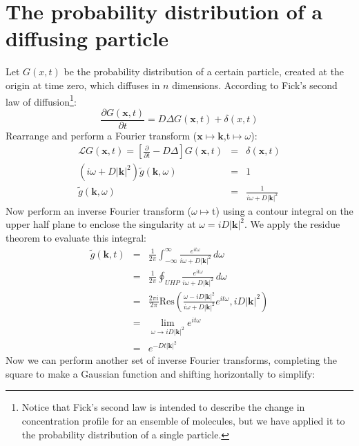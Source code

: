 \documentclass{article}
\begin{document}
\large

\section*{The probability distribution of a diffusing particle}
Let  $G(x,t)$ be the probability distribution of a certain particle, created at the origin at time zero, which diffuses in $n$ dimensions. According to Fick's second law of diffusion\footnote{Notice that Fick's second law is intended to describe the change in concentration profile for an ensemble of molecules, but we have applied it to the probability distribution of a single particle.}:
\[ \frac{\partial G(\mathbf{x},t)}{\partial t} = D \Delta G(\mathbf{x},t) + \delta(x,t) \]
Rearrange and perform a Fourier transform ($\mathbf{x} \mapsto \mathbf{k}$,t$\mapsto \omega$):
\begin{eqnarray}
\mathcal{L}G(\mathbf{x},t) = \left[ \frac{\partial}{\partial t} - D \Delta \right]G(\mathbf{x},t) & = & \delta(\mathbf{x},t) \nonumber \\
\left(i\omega + D|\mathbf{k}|^2 \right) \tilde{g}(\mathbf{k},\omega) & = & 1 \nonumber \\
\tilde{g}(\mathbf{k},\omega) & = & \frac{1}{i\omega + D|\mathbf{k}|^2} \nonumber
\end{eqnarray}
Now perform an inverse Fourier transform ($\omega \mapsto$t) using a contour integral on the upper half plane to enclose the singularity at $\omega=iD|\mathbf{k}|^2$. We apply the residue theorem to evaluate this integral:
\begin{eqnarray}
\tilde{g}(\mathbf{k},t) & = & \frac{1}{2\pi} \int_{-\infty}^{\infty} \frac{e^{it\omega}}{i\omega + D|\mathbf{k}|^2}\,d\omega \nonumber \\
& = & \frac{1}{2\pi} \oint_{UHP} \frac{e^{it\omega}}{i\omega + D|\mathbf{k}|^2}\,d\omega \nonumber \\
& = & \frac{2\pi i}{2\pi} \textrm{Res} \left( \frac{\omega - iD|\mathbf{k}|^2}{i\omega + D|\mathbf{k}|^2}e^{it\omega}, iD|\mathbf{k}|^2 \right) \nonumber \\
& = & \lim_{\omega \to iD|\mathbf{k}|^2} e^{it\omega} \nonumber \\
& = & e^{-Dt|\mathbf{k}|^2} \nonumber
\end{eqnarray}
Now we can perform another set of inverse Fourier transforms, completing the square to make a Gaussian function and shifting horizontally to simplify:
\end{document}
